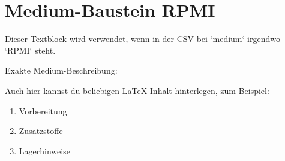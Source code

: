 \section*{Medium-Baustein RPMI}

Dieser Textblock wird verwendet, wenn in der CSV bei `medium` irgendwo `RPMI` steht.

Exakte Medium-Beschreibung:

\textbf{\MediumBeschreibung}

Auch hier kannst du beliebigen LaTeX-Inhalt hinterlegen, zum Beispiel:

\begin{enumerate}
\item Vorbereitung
\item Zusatzstoffe
\item Lagerhinweise
\end{enumerate}
